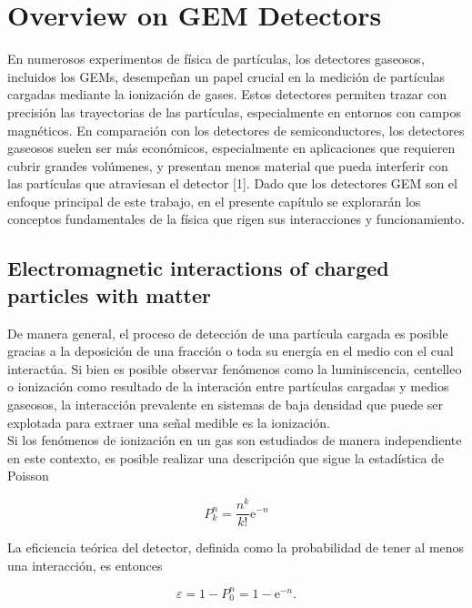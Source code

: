 \documentclass[]{book}
\begin{document}
\chapter*{Overview on GEM Detectors}

En numerosos experimentos de física de partículas, los detectores gaseosos, incluidos los GEMs, desempeñan un papel crucial en la medición de partículas cargadas mediante la ionización de gases. Estos detectores permiten trazar con precisión las trayectorias de las partículas, especialmente en entornos con campos magnéticos. En comparación con los detectores de semiconductores, los detectores gaseosos suelen ser más económicos, especialmente en aplicaciones que requieren cubrir grandes volúmenes, y presentan menos material que pueda interferir con las partículas que atraviesan el detector [1]. Dado que los detectores GEM son el enfoque principal de este trabajo, en el presente capítulo se explorarán los conceptos fundamentales de la física que rigen sus interacciones y funcionamiento.

\section{Electromagnetic interactions of charged particles with matter}

\noindent De manera general, el proceso de detección de una partícula cargada es posible gracias a la deposición de una fracción o toda su energía en el medio con el cual interactúa. Si bien es posible observar fenómenos como la luminiscencia, centelleo o ionización como resultado de la interación entre partículas cargadas y medios gaseosos, la interacción prevalente en sistemas de baja densidad que puede ser explotada para extraer una señal medible es la ionización.\\

\noindent Si los fenómenos de ionización en un gas son estudiados de manera independiente en este contexto, es posible realizar una descripción que sigue la estadística de Poisson

\begin{equation}
    \label{eq:poisson}
    P_k^n=\frac{n^k}{k!} \mathrm{e}^{-n}
\end{equation}

\noindent La eficiencia teórica del detector, definida como la probabilidad de tener al menos una interacción, es entonces

\begin{equation}
    \label{eq:det_eff}
    \varepsilon=1-P_0^n=1-\mathrm{e}^{-n} .
\end{equation}
\end{document}

